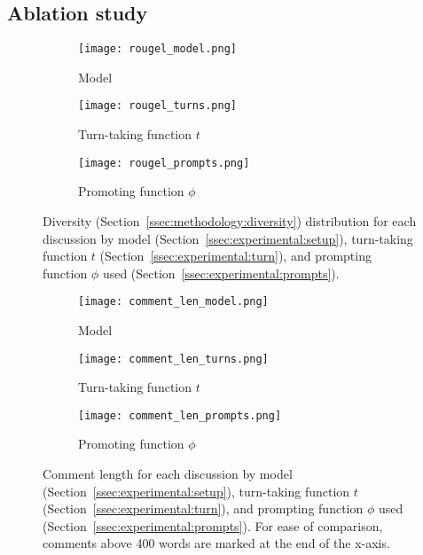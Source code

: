 \subsection{Ablation study}
\label{ssec:results:ablation}

\begin{figure*}[t]
    \begin{subfigure}{0.32\linewidth}
        \texttt{[image: rougel\_model.png]}
        \caption{Model}
        \label{fig:rougel_model}
    \end{subfigure}%
    \hfill
    \begin{subfigure}{0.32\linewidth}
        \texttt{[image: rougel\_turns.png]}
        \caption{Turn-taking function $t$}
        \label{fig:rougel_turns}
    \end{subfigure}%
    \hfill
    \begin{subfigure}{0.32\linewidth}
        \texttt{[image: rougel\_prompts.png]}
        \caption{Promoting function $\phi$}
        \label{fig:rougel_prompts}
    \end{subfigure}%

    \caption{Diversity (Section~\ref{ssec:methodology:diversity}) distribution for each discussion by model (Section~\ref{ssec:experimental:setup}), turn-taking function $t$ (Section~\ref{ssec:experimental:turn}), and prompting function $\phi$ used (Section~\ref{ssec:experimental:prompts}).}
    \label{fig:diversity}
\end{figure*}

\begin{figure*}[t]
    \begin{subfigure}{0.32\linewidth}
        \texttt{[image: comment\_len\_model.png]}
        \caption{Model}
        \label{fig:comment_length_model}
    \end{subfigure}%
    \hfill
    \begin{subfigure}{0.32\linewidth}
        \texttt{[image: comment\_len\_turns.png]}
        \caption{Turn-taking function $t$}
        \label{fig:comment_length_turns}
    \end{subfigure}%
    \hfill
    \begin{subfigure}{0.32\linewidth}
        \texttt{[image: comment\_len\_prompts.png]}
        \caption{Promoting function $\phi$}
        \label{fig:comment_length_prompts}
    \end{subfigure}%

    \caption{Comment length for each discussion by model (Section~\ref{ssec:experimental:setup}), turn-taking function $t$ (Section~\ref{ssec:experimental:turn}), and prompting function $\phi$ used (Section~\ref{ssec:experimental:prompts}). For ease of comparison, comments above 400 words are marked at the end of the x-axis.}
    \label{fig:comment_length}
\end{figure*}


